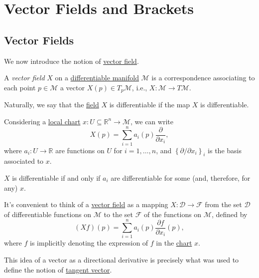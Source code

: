 \section{Vector Fields and Brackets}
\subsection{Vector Fields}
We now introduce the notion of \hyperref[def:vector-field]{vector field}.

\begin{definition}\label{def:vector-field}
	A \emph{vector field} \(X\) on a \hyperref[def:smooth-manifold]{differentiable manifold} \(\mathcal{M} \) is a correspondence associating to each point \(p\in \mathcal{M} \) a vector \(X(p)\in T_p \mathcal{M} \), i.e., \(X\colon \mathcal{M} \to T\mathcal{M} \).
\end{definition}

\begin{remark}
	Naturally, we say that the \hyperref[def:vector-field]{field} \(X\) is differentiable if the map \(X\) is differentiable.
\end{remark}

Considering a \hyperref[def:coordinate-chart]{local chart} \(x\colon U \subseteq \mathbb{R} ^n \to \mathcal{M} \), we can write
\[
	X(p) = \sum_{i=1}^{n} a_i(p) \frac{\partial }{\partial x_i},
\]
where \(a_i\colon U \to \mathbb{R} \) are functions on \(U\) for \(i = 1, \ldots , n\), and \(\left\{ \partial / \partial x_i \right\}_{i} \) is the basis associated to \(x\).

\begin{remark}
	\(X\) is differentiable if and only if \(a_i\) are differentiable for some (and, therefore, for any) \(x\).
\end{remark}

It's convenient to think of a \hyperref[def:vector-field]{vector field} as a mapping \(X\colon \mathcal{D} \to \mathcal{F} \) from the set \(\mathcal{D} \) of differentiable functions on \(\mathcal{M} \) to the set \(\mathcal{F} \) of the functions on \(\mathcal{M} \), defined by
\[
	(Xf)(p) = \sum_{i=1}^{n} a_i(p)\frac{\partial f}{\partial x_i} (p),
\]
where \(f\) is implicitly denoting the expression of \(f\) in the \hyperref[def:coordinate-chart]{chart} \(x\).

\begin{intuition}
	This idea of a vector as a directional derivative is precisely what was used to define the notion of \hyperref[def:tangent-vector]{tangent vector}.
\end{intuition}

